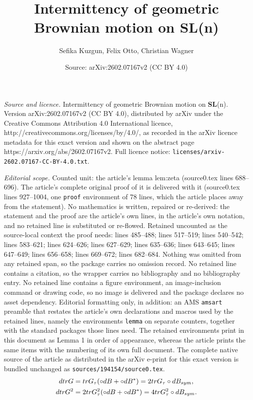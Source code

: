 \documentclass[10pt,a4paper]{amsart}
\title{Intermittency of geometric Brownian motion on \textbf{SL}(\lowercase{n})}
\author{Sefika Kuzgun, Felix Otto, Christian Wagner}
\date{Source: arXiv:2602.07167v2 (CC BY 4.0)}
\def\tr{{\rm tr}}
\begin{document}
\maketitle

\noindent\emph{Source and licence.} Intermittency of geometric Brownian motion on \textbf{SL}(\lowercase{n}). Version arXiv:2602.07167v2 (CC BY 4.0), distributed by arXiv under the Creative Commons Attribution 4.0 International licence, http://creativecommons.org/licenses/by/4.0/, as recorded in the arXiv licence metadata for this exact version and shown on the abstract page https://arxiv.org/abs/2602.07167v2. Full licence notice: \texttt{licenses/arxiv-2602.07167-CC-BY-4.0.txt}.\par\smallskip

\noindent\textit{Editorial scope.} Counted unit: the article's lemma lem:zeta (source0.tex lines 688--696). The article's complete original proof of it is delivered with it (source0.tex lines 927--1004, one \texttt{proof} environment of 78 lines, which the article places away from the statement). No mathematics is written, repaired or re-derived: the statement and the proof are the article's own lines, in the article's own notation, and no retained line is substituted or re-flowed.  Retained uncounted as the source-local context the proof needs: lines 485--488; lines 517--519; lines 540--542; lines 583--621; lines 624--626; lines 627--629; lines 635--636; lines 643--645; lines 647--649; lines 656--658; lines 669--672; lines 682--684.  Nothing was omitted from any retained span, so the package carries no omission record.  No retained line contains a citation, so the wrapper carries no bibliography and no bibliography entry.  No retained line contains a figure environment, an image-inclusion command or drawing code, so no image is delivered and the package declares no asset dependency.  Editorial formatting only, in addition: an AMS \texttt{amsart} preamble that restates the article's own declarations and macros used by the retained lines, namely the environments \texttt{lemma} on separate counters, together with the standard packages those lines need.  The retained environments print in this document as Lemma 1 in order of appearance, whereas the article prints the same items with the numbering of its own full document.  The complete native source of the article as distributed in the arXiv e-print for this exact version is bundled unchanged as \texttt{sources/194154/source0.tex}.
 \begin{align}
    d\tr G &=\tr G_\tau (\circ dB+\circ dB^*) =2\tr G_\tau \circ dB_{sym}, \label{trgstr} \\
    d\tr G^2&=2\tr G^2_\tau (\circ dB+\circ dB^*) =4\tr G^2_\tau\circ dB_{sym}. \label{trG2str} 
\end{align}
\end{document}
